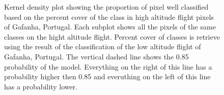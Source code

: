 \documentclass[
  number]{elsarticle}
\begin{document}
\label{cell-fig-upscaling}
\begin{figure}[H]


\caption{\label{fig-upscaling}Kernel density plot showing the proportion
of pixel well classified based on the percent cover of the class in high
altitude flight pixels of Gafanha, Portugal. Each subplot shows all the
pixels of the same classes on the hight altitude flight. Percent cover
of classes is retrieve using the result of the classification of the low
altitude flight of Gafanha, Portugal. The vertical dashed line shows the
0.85 probability of the model. Everything on the right of this line has
a probability higher then 0.85 and everuthing on the left of this line
has a probability lower.}

\end{figure}%
\end{document}
